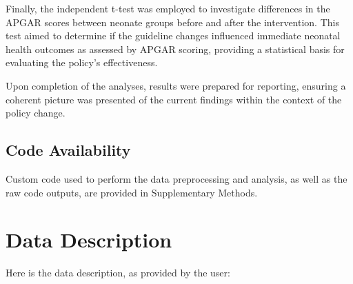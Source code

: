 \documentclass[11pt]{article}
\begin{document}
Finally, the independent t-test was employed to investigate differences in the APGAR scores between neonate groups before and after the intervention. This test aimed to determine if the guideline changes influenced immediate neonatal health outcomes as assessed by APGAR scoring, providing a statistical basis for evaluating the policy's effectiveness.

Upon completion of the analyses, results were prepared for reporting, ensuring a coherent picture was presented of the current findings within the context of the policy change.\subsection*{Code Availability}

Custom code used to perform the data preprocessing and analysis, as well as the raw code outputs, are provided in Supplementary Methods.






\clearpage
\appendix

\section{Data Description} \label{sec:data_description} Here is the data description, as provided by the user:
\end{document}
